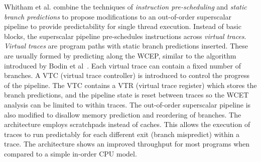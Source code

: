 

Whitham et al. \cite{whitham:08:predOOOwithVirtualTraces} combine the techniques of \emph{instruction pre-scheduling} and \emph{static branch predictions} to propose modifications to an out-of-order superscalar pipeline to provide predictability for single thread execution.  
Instead of basic blocks, the superscalar pipeline pre-schedules instructions across \emph{virtual traces}\cite{Whitham2008formvirtualtraces}. 
\emph{Virtual traces} are program paths with static branch predictions inserted. 
These are usually formed by predicting along the WCEP, similar to the algorithm introduced by Bodin et al~\cite{Bodin2005staticbranch}. 
Each virtual trace can contain a fixed number of branches. 
A VTC (virtual trace controller) is introduced to control the progress of the pipeline.
The VTC contains a VTR (virtual trace register) which stores the branch predictions, and the pipeline state is reset between traces so the WCET analysis can be limited to within traces.
The out-of-order superscalar pipeline is also modified to disallow memory prediction and reordering of branches.
The architecture employs scratchpads instead of caches.  
This allows the execution of traces to run predictably for each different exit (branch mispredict) within a trace.
The architecture shows an improved throughput for most programs when compared to a simple in-order CPU model.

